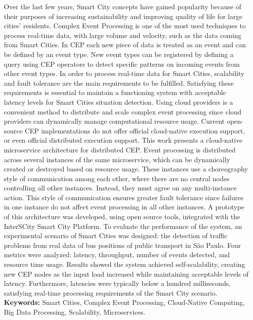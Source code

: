 \documentclass[11pt,twoside,a4paper]{book}
\begin{document}
Over the last few years, Smart City concepts have gained popularity because of their purposes of increasing sustainability and improving quality of life for large cities' residents. Complex Event Processing is one of the most used techniques to process real-time data, with large volume and velocity, such as the data coming from Smart Cities. In CEP each new piece of data is treated as an event and can be defined by an event type. New event types can be registered by defining a query using CEP operators to detect specific patterns on incoming events from other event types. In order to process real-time data for Smart Cities, scalability and fault tolerance are the main requirements to be fulfilled. Satisfying these requirements is essential to maintain a functioning system with acceptable latency levels for Smart Cities situation detection. Using cloud providers is a convenient method to distribute and scale complex event processing since cloud providers can dynamically manage computational resource usage. Current open-source CEP implementations do not offer official cloud-native execution support, or even official distributed execution support.  This work presents a cloud-native microservice architecture for distributed CEP. Event processing is distributed across several instances of the same microservice, which can be dynamically created or destroyed based on resource usage. These instances use a choreography style of communication among each other, where there are no central nodes controlling all other instances. Instead, they must agree on any multi-instance action. This style of communication ensures greater fault tolerance since failures in one instance do not affect event processing in all other instances. A prototype of this architecture was developed, using open source tools, integrated with the InterSCity Smart City Platform. 
To evaluate the performance of the system, an experimental scenario of Smart Cities was designed: the detection of traffic problems from real data of bus positions of public transport in São Paulo. Four metrics were analyzed: latency, throughput, number of events detected, and resource time usage. Results showed the system achieved self-scalability, creating new CEP nodes as the input load increased while maintaining acceptable levels of latency. Furthermore, latencies were typically below a hundred milliseconds, satisfying real-time processing requirements of the Smart City scenario. \\


\noindent \textbf{Keywords:} Smart Cities, Complex Event Processing,  Cloud-Native Computing, Big Data Processing, Scalability, Microservices.
\end{document}
